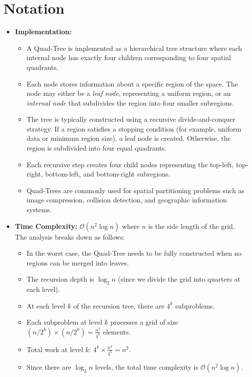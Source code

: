 \section {Notation}

\begin{itemize}
    \item \textbf{Implementation:}
    \begin{itemize}
        \item A Quad-Tree is implemented as a hierarchical tree structure where each internal node has exactly four children corresponding to four spatial quadrants.
        \item Each node stores information about a specific region of the space. The node may either be a \textit{leaf node}, representing a uniform region, or an \textit{internal node} that subdivides the region into four smaller subregions.
        \item The tree is typically constructed using a recursive divide-and-conquer strategy. If a region satisfies a stopping condition (for example, uniform data or minimum region size), a leaf node is created. Otherwise, the region is subdivided into four equal quadrants.
        \item Each recursive step creates four child nodes representing the top-left, top-right, bottom-left, and bottom-right subregions.
        \item Quad-Trees are commonly used for spatial partitioning problems such as image compression, collision detection, and geographic information systems.
    \end{itemize}
    \item \textbf{Time Complexity:} $\mathcal{O}(n^2 \log n)$ where $n$ is the side length of the grid.\\
    The analysis breaks down as follows:
    \begin{itemize}
        \item In the worst case, the Quad-Tree needs to be fully constructed when no regions can be merged into leaves.
        \item The recursion depth is $\log_2 n$ (since we divide the grid into quarters at each level).
        \item At each level $k$ of the recursion tree, there are $4^k$ subproblems.
        \item Each subproblem at level $k$ processes a grid of size $(n/2^k) \times (n/2^k) = \frac{n^2}{4^k}$ elements.
        \item Total work at level $k$: $4^k \times \frac{n^2}{4^k} = n^2$.
        \item Since there are $\log_2 n$ levels, the total time complexity is $\mathcal{O}(n^2 \log n)$.
    \end{itemize}
    

\end{itemize}
